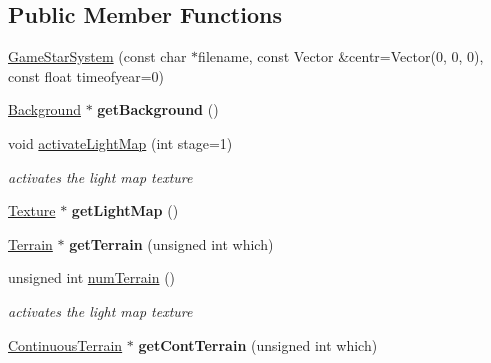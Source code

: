 \subsection*{Public Member Functions}
\begin{DoxyCompactItemize}
\item 
\hyperlink{classGameStarSystem_adc47d08069caab62564ed07668457d5d}{Game\+Star\+System} (const char $\ast$filename, const Vector \&centr=Vector(0, 0, 0), const float timeofyear=0)
\item 
\hyperlink{classBackground}{Background} $\ast$ {\bfseries get\+Background} ()\hypertarget{classGameStarSystem_a3a797a7ae91116f1f86ad8ad593a019a}{}\label{classGameStarSystem_a3a797a7ae91116f1f86ad8ad593a019a}

\item 
void \hyperlink{classGameStarSystem_ae31c600a5ee91ef9b3603634825d7a0c}{activate\+Light\+Map} (int stage=1)\hypertarget{classGameStarSystem_ae31c600a5ee91ef9b3603634825d7a0c}{}\label{classGameStarSystem_ae31c600a5ee91ef9b3603634825d7a0c}

\begin{DoxyCompactList}\small\item\em activates the light map texture \end{DoxyCompactList}\item 
\hyperlink{classTexture}{Texture} $\ast$ {\bfseries get\+Light\+Map} ()\hypertarget{classGameStarSystem_ae234218f0135455d519436593d930098}{}\label{classGameStarSystem_ae234218f0135455d519436593d930098}

\item 
\hyperlink{classTerrain}{Terrain} $\ast$ {\bfseries get\+Terrain} (unsigned int which)\hypertarget{classGameStarSystem_ade6504cb01fc50681a214d545f092c8b}{}\label{classGameStarSystem_ade6504cb01fc50681a214d545f092c8b}

\item 
unsigned int \hyperlink{classGameStarSystem_a08724f59ce670c81fd5c43aef06401c1}{num\+Terrain} ()\hypertarget{classGameStarSystem_a08724f59ce670c81fd5c43aef06401c1}{}\label{classGameStarSystem_a08724f59ce670c81fd5c43aef06401c1}

\begin{DoxyCompactList}\small\item\em activates the light map texture \end{DoxyCompactList}\item 
\hyperlink{classContinuousTerrain}{Continuous\+Terrain} $\ast$ {\bfseries get\+Cont\+Terrain} (unsigned int which)\hypertarget{classGameStarSystem_ada3bbeeb2af95f7cf4a191188eab6e86}{}\label{classGameStarSystem_ada3bbeeb2af95f7cf4a191188eab6e86}


\end{DoxyCompactItemize}
